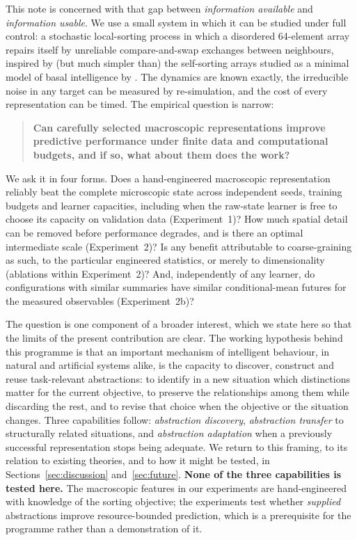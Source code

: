 \documentclass[11pt,a4paper]{article}
\begin{document}
This note is concerned with that gap between \emph{information available} and
\emph{information usable}. We use a small system in which it can be studied
under full control: a stochastic local-sorting process in which a disordered
64-element array repairs itself by unreliable compare-and-swap exchanges
between neighbours, inspired by (but much simpler than) the self-sorting arrays
studied as a minimal model of basal intelligence by \citet{zhang2025}. The
dynamics are known exactly, the irreducible noise in any target can be measured
by re-simulation, and the cost of every representation can be timed. The
empirical question is narrow:
\begin{quote}
\textbf{Can carefully selected macroscopic representations improve predictive
performance under finite data and computational budgets, and if so, what about
them does the work?}
\end{quote}
We ask it in four forms. Does a hand-engineered macroscopic representation
reliably beat the complete microscopic state across independent seeds,
training budgets and learner capacities, including when the raw-state learner
is free to choose its capacity on validation data (Experiment~1)? How much
spatial detail can be removed before performance degrades, and is there an
optimal intermediate scale (Experiment~2)? Is any benefit attributable to
coarse-graining as such, to the particular engineered statistics, or merely to
dimensionality (ablations within Experiment~2)? And, independently of any
learner, do configurations with similar summaries have similar conditional-mean
futures for the measured observables (Experiment~2b)?

The question is one component of a broader interest, which we state here so
that the limits of the present contribution are clear. The working hypothesis
behind this programme is that an important mechanism of intelligent behaviour,
in natural and artificial systems alike, is the capacity to discover, construct
and reuse task-relevant abstractions: to identify in a new situation which
distinctions matter for the current objective, to preserve the relationships
among them while discarding the rest, and to revise that choice when the
objective or the situation changes. Three capabilities follow:
\emph{abstraction discovery}, \emph{abstraction transfer} to structurally
related situations, and \emph{abstraction adaptation} when a previously
successful representation stops being adequate. We return to this framing, to
its relation to existing theories, and to how it might be tested, in
Sections~\ref{sec:discussion} and~\ref{sec:future}. \textbf{None of the three
capabilities is tested here.} The macroscopic features in our experiments are
hand-engineered with knowledge of the sorting objective; the experiments test
whether \emph{supplied} abstractions improve resource-bounded prediction, which
is a prerequisite for the programme rather than a demonstration of it.
\end{document}
